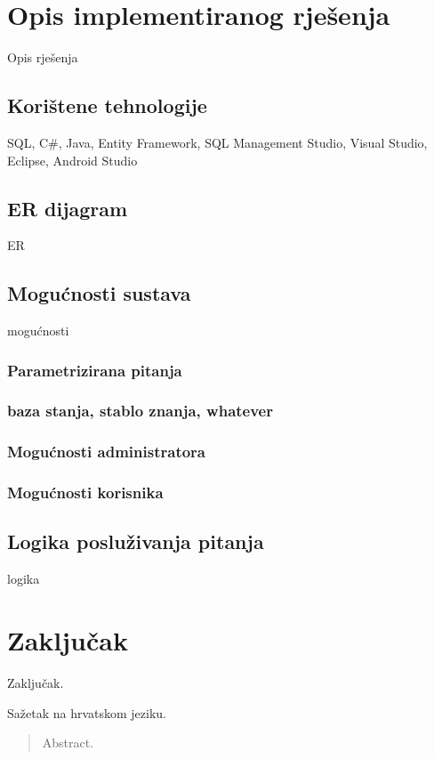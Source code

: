 \documentclass[times, utf8, zavrsni]{fer}
\begin{document}
\chapter{Opis implementiranog rješenja}
Opis rješenja

\section{Korištene tehnologije}
SQL, C\#, Java, Entity Framework,
SQL Management Studio, Visual Studio, Eclipse, Android Studio

\section{ER dijagram}
ER

\section{Mogućnosti sustava}
mogućnosti

\subsection{Parametrizirana pitanja}

\subsection{baza stanja, stablo znanja, whatever}

\subsection{Mogućnosti administratora}

\subsection{Mogućnosti korisnika}

\section{Logika posluživanja pitanja}
logika

\chapter{Zaključak}
Zaključak.




\begin{sazetak}
Sažetak na hrvatskom jeziku.

\end{sazetak}

\begin{abstract}
Abstract.

\end{abstract}
\end{document}
